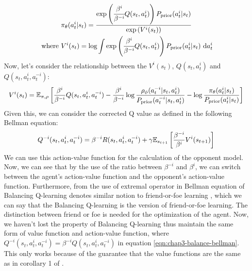 \begin{equation}
\begin{aligned}
\label{eqn:chap3-prob-agent}
    &\pi_\theta(a^{i}_t | s_t) = \frac{\exp \left(  \cfrac{\beta^{i}}{\beta^{-i}} Q(s_t, a^{i}_t) \right) P_{\text{prior}}(a^{i}_t | s_t)}{\exp\left( V^{i}(s_t) \right)} \\
    \text{ where }& V^{i}(s_t) = \log \int \exp \left(  \cfrac{\beta^{i}}{\beta^{-i}} Q(s_t, a^{i}_t) \right) P_{\text{prior}}(a^{i}_t | s_t) \ \mathrm{d} a^{i}_t
\end{aligned}
\end{equation}
Now, let's consider the relationship between the $V^{i}(s_t)$, $Q(s_t, a_t^{i})$ and $Q(s_t, a^i_t, a^{-i}_t)$:
\begin{equation}
\label{eqn:chap3-prob-balance-val}
    V^{i}(s_t) = \mathbb{E}_{\pi, \rho}\left[ \frac{\beta^{i}}{\beta^{-i}} Q(s_t, a^i_t, a^{-i}_t) - \frac{\beta^{i}}{\beta^{-i}}\log\frac{\rho_\phi(a^{-i}_t | s_t, a^i_t)}{P_{\text{prior}}( a^{-i}_t| s_t, a^i_t)} - \log \frac{\pi_\theta(a^{i}_t | s_t)}{P_{\text{prior}}(a^{i}_t | s_t)} \right]
\end{equation}
Given this, we can consider the corrected Q value as defined in the following Bellman equation:
\begin{equation}
    Q^{-i}(s_t, a^i_t, a^{-i}_t) = \beta^{-i} R(s_t, a^i_t, a^{-i}_t) + \gamma \mathbb{E}_{s_{t+1}}\left[ \frac{\beta^{-i}}{\beta^i}V^{i}(s_{t+1}) \right]    
\end{equation}
We can use this action-value function for the calculation of the opponent model. Now, we can see that by the use of the ratio between $\beta^{-i}$ and $\beta^{i}$, we can switch between the agent's action-value function and the opponent's action-value function. Furthermore, from the use of extremal operator in Bellman equation \cite{grau2018balancing} of Balancing Q-learning denotes similar notion to friend-or-foe learning \cite{littman2001friend}, which we can say that the Balancing Q-learning is the  version of friend-or-foe learning. The distinction between friend or foe is needed for the optimization of the agent. Now, we haven't lost the property of Balancing Q-learning thus maintain the same form of value function and action-value function, where $Q^{-i}(s_t, a^i_t, a^{-i}_t) = \beta^{-i} Q(s_t, a^i_t, a^{-i}_t)$ in equation \ref{eqn:chap3-balance-bellman}. This only works because of the guarantee that the value functions are the same as in corollary 1 of \cite{grau2018balancing}. 

